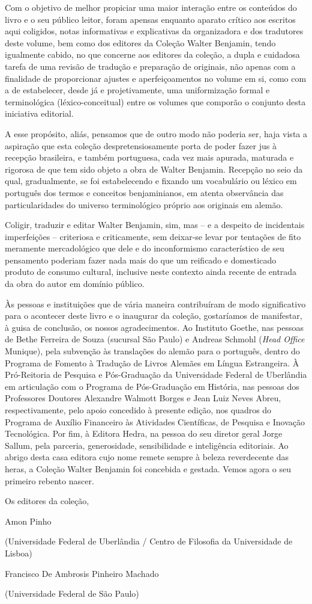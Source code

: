 Com o objetivo de melhor propiciar uma maior interação entre os
conteúdos do livro e o seu público leitor, foram apensas enquanto
aparato crítico aos escritos aqui coligidos, notas informativas e
explicativas da organizadora e dos tradutores deste volume, bem como dos
editores da Coleção Walter Benjamin, tendo igualmente cabido, no que
concerne aos editores da coleção, a dupla e cuidadosa tarefa de uma
revisão de tradução e preparação de originais, não apenas com a
finalidade de proporcionar ajustes e aperfeiçoamentos no volume em si,
como com a de estabelecer, desde já e projetivamente, uma uniformização
formal e terminológica (léxico-conceitual) entre os volumes que comporão
o conjunto desta iniciativa editorial.

A esse propósito, aliás, pensamos que de outro modo não poderia ser,
haja vista a aspiração que esta coleção despretensiosamente porta de
poder fazer jus à recepção brasileira, e também portuguesa, cada vez
mais apurada, maturada e rigorosa de que tem sido objeto a obra de
Walter Benjamin. Recepção no seio da qual, gradualmente, se foi
estabelecendo e fixando um vocabulário ou léxico em português dos termos
e conceitos benjaminianos, em atenta observância das particularidades do
universo terminológico próprio aos originais em alemão.

Coligir, traduzir e editar Walter Benjamin, sim, mas -- e a despeito de
incidentais imperfeições -- criteriosa e criticamente, sem deixar-se
levar por tentações de fito meramente mercadológico que dele e do
inconformismo característico de seu pensamento poderiam fazer nada mais
do que um reificado e domesticado produto de consumo cultural, inclusive
neste contexto ainda recente de entrada da obra do autor em domínio
público.

Às pessoas e instituições que de vária maneira contribuíram de modo
significativo para o acontecer deste livro e o inaugurar da coleção,
gostaríamos de manifestar, à guisa de conclusão, os nossos
agradecimentos. Ao Instituto Goethe, nas pessoas de Bethe Ferreira de
Souza (sucursal São Paulo) e Andreas Schmohl (\emph{Head Office}
Munique), pela subvenção às translações do alemão para o português,
dentro do Programa de Fomento à Tradução de Livros Alemães em Língua
Estrangeira. À Pró-Reitoria de Pesquisa e Pós-Graduação da Universidade
Federal de Uberlândia em articulação com o Programa de Pós-Graduação em
História, nas pessoas dos Professores Doutores Alexandre Walmott Borges
e Jean Luiz Neves Abreu, respectivamente, pelo apoio concedido à
presente edição, nos quadros do Programa de Auxílio Financeiro às
Atividades Científicas, de Pesquisa e Inovação Tecnológica. Por fim, à
Editora Hedra, na pessoa do seu diretor geral Jorge Sallum, pela
parceria, generosidade, sensibilidade e inteligência editoriais. Ao
abrigo desta casa editora cujo nome remete sempre à beleza reverdecente
das heras, a Coleção Walter Benjamin foi concebida e gestada. Vemos
agora o seu primeiro rebento nascer.

Os editores da coleção,

Amon Pinho

(Universidade Federal de Uberlândia / Centro de Filosofia da
Universidade de Lisboa)

Francisco De Ambrosis Pinheiro Machado

(Universidade Federal de São Paulo)
